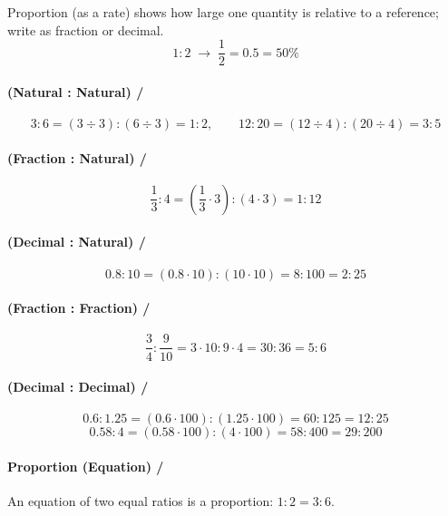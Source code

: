 Proportion (as a rate) shows how large one quantity is relative to a reference; write as fraction or decimal.
\[
1:2\;\to\;\dfrac{1}{2}=0.5=50\%
\]

\paragraph{(Natural : Natural) / }
\[
3:6=(3\div3):(6\div3)=1:2,\qquad
12:20=(12\div4):(20\div4)=3:5
\]

\paragraph{(Fraction : Natural) / }
\[
\dfrac{1}{3}:4=\left(\dfrac{1}{3}\cdot3\right):(4\cdot3)=1:12
\]

\paragraph{(Decimal : Natural) / }
\[
0.8:10=(0.8\cdot10):(10\cdot10)=8:100=2:25
\]

\paragraph{(Fraction : Fraction) / }
\[
\dfrac{3}{4}:\dfrac{9}{10}=3\cdot10:9\cdot4=30:36=5:6
\]

\paragraph{(Decimal : Decimal) / }
\[
0.6:1.25=(0.6\cdot100):(1.25\cdot100)=60:125=12:25
\]
\[
0.58:4=(0.58\cdot100):(4\cdot100)=58:400=29:200
\]

\paragraph{Proportion (Equation) / }

An equation of two equal ratios is a proportion: $1:2=3:6$.

